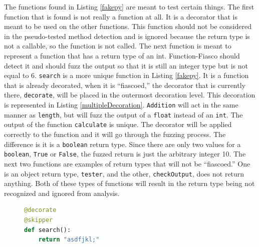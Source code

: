 The functions found in Listing \ref{fakepy} are meant to test certain things. The first function that is found is not really a function at all. It is a decorator that is meant to be used on the other functions. This function should not be considered in the pseudo-tested method detection and is ignored because the return type is not a callable, so the function is not called. The next function is meant to represent a function that has a return type of an int. Function-Fiasco should detect it and should fuzz the output so that it is still an integer type but is not equal to 6. \texttt{search} is a more unique function in Listing \ref{fakepy}. It is a function that is already decorated, when it is ``fiascoed,'' the decorator that is currently there, \texttt{decorate}, will be placed in the outermost decoration level. This decoration is represented in Listing \ref{multipleDecoration}. \texttt{Addition} will act in the same manner as \texttt{length}, but will fuzz the output of a \texttt{float} instead of an \texttt{int}. The output of the function \texttt{calculate} is unique. The decorator will be applied correctly to the function and it will go through the fuzzing process. The difference is it is a \texttt{boolean} return type. Since there are only two values for a \texttt{boolean}, \texttt{True} or \texttt{False}, the fuzzed return is just the arbitrary integer 10. The next two functions are examples of return types that will not be ``fiascoed.'' One is an object return type, \texttt{tester}, and the other, \texttt{checkOutput}, does not return anything. Both of these types of functions will result in the return type being not recognized and ignored from analysis.


\begin{figure}[t!]
\begin{lstlisting}[language = Python, frame = single, caption = Example of multiple decoration., label = multipleDecoration]
@decorate
@skipper
def search():
    return "asdfjkl;"
\end{lstlisting}
\end{figure}




